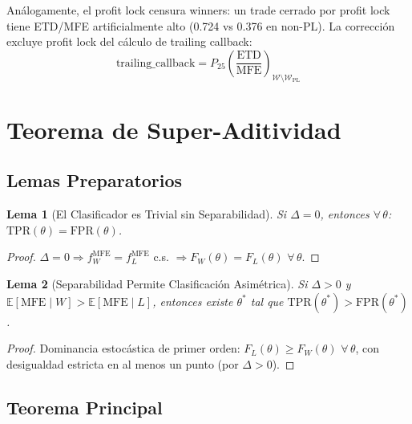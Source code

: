 \documentclass[11pt,a4paper]{article}
\newtheorem{lemma}{Lema}[section]
\newcommand{\E}{\mathbb{E}}
\begin{document}
An\'alogamente, el profit lock censura winners: un trade cerrado por
profit lock tiene ETD/MFE artificialmente alto (0.724 vs 0.376 en
non-PL). La correcci\'on excluye profit lock del c\'alculo de
trailing callback:
\begin{equation}
\text{trailing\_callback} = P_{25}\!\left(\frac{\text{ETD}}{\text{MFE}}\right)_{\mathcal{W} \setminus \mathcal{W}_{\text{PL}}}
\end{equation}


\section{Teorema de Super-Aditividad}
\label{sec:superadd}

\subsection{Lemas Preparatorios}

\begin{lemma}[El Clasificador es Trivial sin Separabilidad]
\label{lem:trivial}
Si $\Delta = 0$, entonces $\forall\, \theta$:
$\mathrm{TPR}(\theta) = \mathrm{FPR}(\theta)$.
\end{lemma}

\begin{proof}
$\Delta = 0 \Rightarrow f_W^{\text{MFE}} = f_L^{\text{MFE}}$ c.s.
$\Rightarrow F_W(\theta) = F_L(\theta)$ $\forall\,\theta$.
\end{proof}

\begin{lemma}[Separabilidad Permite Clasificaci\'on Asim\'etrica]
\label{lem:asymmetric}
Si $\Delta > 0$ y $\E[\text{MFE} \mid W] > \E[\text{MFE} \mid L]$,
entonces existe $\theta^*$ tal que
$\mathrm{TPR}(\theta^*) > \mathrm{FPR}(\theta^*)$.
\end{lemma}

\begin{proof}
Dominancia estoc\'astica de primer orden: $F_L(\theta) \geq F_W(\theta)$
$\forall\,\theta$, con desigualdad estricta en al menos un punto
(por $\Delta > 0$).
\end{proof}


\subsection{Teorema Principal}
\end{document}
